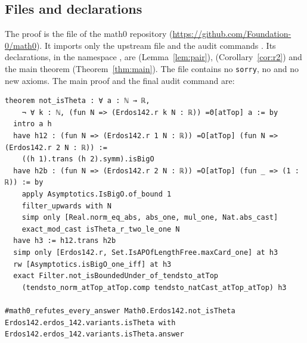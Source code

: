 \documentclass[11pt]{amsart}
\theoremstyle{plain}
\theoremstyle{definition}
\begin{document}
\subsection*{Files and declarations}
The proof is the file  of the math0 repository (\url{https://github.com/Foundation-0/math0}).
It imports only the upstream file  and the audit commands .
Its declarations, in the namespace , are  (Lemma~\ref{lem:pair}),  (Corollary~\ref{cor:r2}) and the main theorem  (Theorem~\ref{thm:main}).
The file contains no \texttt{sorry}, no  and no new axioms.
The main proof and the final audit command are:
\begin{lstlisting}
theorem not_isTheta : ∀ a : ℕ → ℝ,
    ¬ ∀ k : ℕ, (fun N => (Erdos142.r k N : ℝ)) =Θ[atTop] a := by
  intro a h
  have h12 : (fun N => (Erdos142.r 1 N : ℝ)) =O[atTop] (fun N => (Erdos142.r 2 N : ℝ)) :=
    ((h 1).trans (h 2).symm).isBigO
  have h2b : (fun N => (Erdos142.r 2 N : ℝ)) =O[atTop] (fun _ => (1 : ℝ)) := by
    apply Asymptotics.IsBigO.of_bound 1
    filter_upwards with N
    simp only [Real.norm_eq_abs, abs_one, mul_one, Nat.abs_cast]
    exact_mod_cast isTheta_r_two_le_one N
  have h3 := h12.trans h2b
  simp only [Erdos142.r, Set.IsAPOfLengthFree.maxCard_one] at h3
  rw [Asymptotics.isBigO_one_iff] at h3
  exact Filter.not_isBoundedUnder_of_tendsto_atTop
    (tendsto_norm_atTop_atTop.comp tendsto_natCast_atTop_atTop) h3

#math0_refutes_every_answer Math0.Erdos142.not_isTheta Erdos142.erdos_142.variants.isTheta with Erdos142.erdos_142.variants.isTheta.answer
\end{lstlisting}
\end{document}
